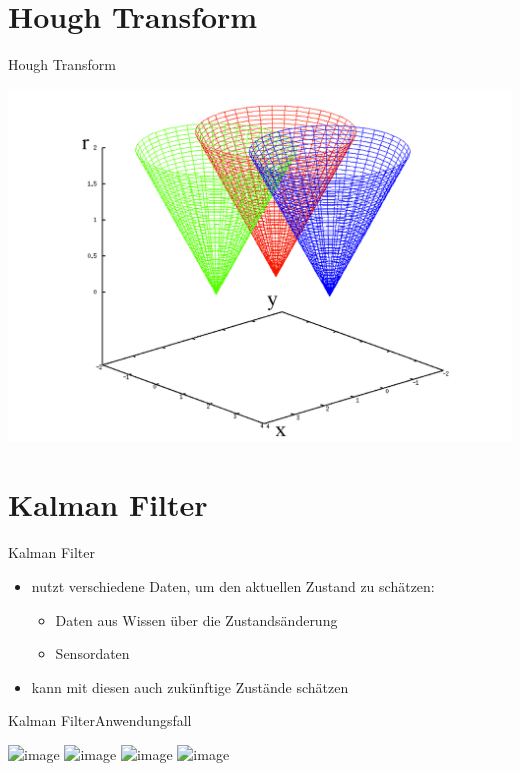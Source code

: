 \documentclass{beamer}
\begin{document}
\section{Hough Transform}

\begin{frame}{Hough Transform}
\color{red}{   FIXME: Thiemo}
\begin{center}\includegraphics[scale=1]{img/Hough3.png}\end{center}
\end{frame}

\section{Kalman Filter}

\begin{frame}{Kalman Filter}
\begin{itemize}
\item nutzt verschiedene Daten, um den aktuellen Zustand zu schätzen:
\begin{itemize}
\item Daten aus Wissen über die Zustandsänderung
\item Sensordaten
\end{itemize}
\item kann mit diesen auch zukünftige Zustände schätzen
\end{itemize}
\end{frame}

\begin{frame}{Kalman Filter}{Anwendungsfall}
\begin{center}
\includegraphics<1-1>[scale=0.45]{img/kalman_0_1.jpg}
\includegraphics<2-2>[scale=0.45]{img/kalman_0_2.jpg}
\includegraphics<3-3>[scale=0.45]{img/kalman_0_3.jpg}
\includegraphics<4-4>[scale=0.45]{img/kalman_0_4.jpg}
\end{center}
\end{frame}
\end{document}
